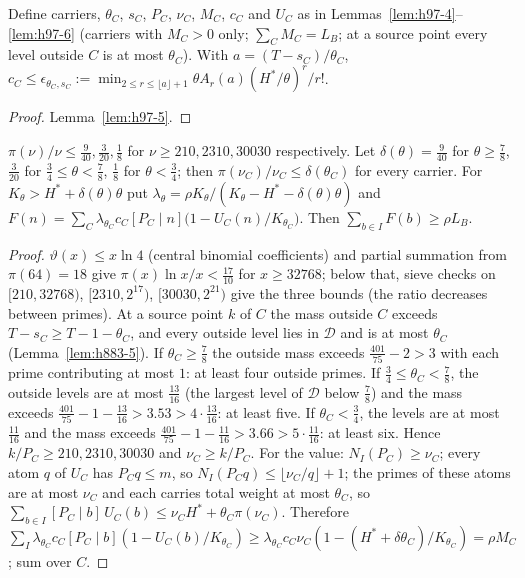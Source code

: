 \begin{lemma}\label{lem:h883-5}
Define carriers, $\theta_C$, $s_C$, $P_C$, $\nu_C$, $M_C$, $c_C$ and $U_C$ as in Lemmas~\ref{lem:h97-4}--\ref{lem:h97-6}
(carriers with $M_C>0$ only; $\sum_CM_C=L_B$; at a source point every level outside $C$ is at most $\theta_C$). With
$a=(T-s_C)/\theta_C$, $c_C\le\epsilon_{\theta_C,s_C}:=\min_{2\le r\le\lfloor a\rfloor+1}\theta A_r(a)(H^*/\theta)^r/r!$.
\end{lemma}
\begin{proof}
Lemma~\ref{lem:h97-5}.
\end{proof}

\begin{lemma}\label{lem:h883-6}
$\pi(\nu)/\nu\le\tfrac9{40},\tfrac3{20},\tfrac18$ for $\nu\ge210,2310,30030$ respectively. Let
$\delta(\theta)=\tfrac9{40}$ for $\theta\ge\tfrac78$, $\tfrac3{20}$ for $\tfrac34\le\theta<\tfrac78$, $\tfrac18$ for
$\theta<\tfrac34$; then $\pi(\nu_C)/\nu_C\le\delta(\theta_C)$ for every carrier. For $K_\theta>H^*+\delta(\theta)\theta$
put $\lambda_\theta=\rho K_\theta/(K_\theta-H^*-\delta(\theta)\theta)$ and
$F(n)=\sum_C\lambda_{\theta_C}c_C[P_C\mid n]\bigl(1-U_C(n)/K_{\theta_C}\bigr)$. Then
$\sum_{b\in I}F(b)\ge\rho L_B$.
\end{lemma}
\begin{proof}
$\vartheta(x)\le x\ln4$ (central binomial coefficients) and partial summation from $\pi(64)=18$ give
$\pi(x)\ln x/x<\tfrac{17}{10}$ for $x\ge32768$; below that, sieve checks on $[210,32768)$, $[2310,2^{17})$,
$[30030,2^{21})$ give the three bounds (the ratio decreases between primes). At a source point $k$ of $C$ the mass
outside $C$ exceeds $T-s_C\ge T-1-\theta_C$, and every outside level lies in $\mathcal D$ and is at most $\theta_C$
(Lemma~\ref{lem:h883-5}). If $\theta_C\ge\tfrac78$ the outside mass exceeds $\tfrac{401}{75}-2>3$ with each prime
contributing at most $1$: at least four outside primes. If $\tfrac34\le\theta_C<\tfrac78$, the outside levels are at
most $\tfrac{13}{16}$ (the largest level of $\mathcal D$ below $\tfrac78$) and the mass exceeds
$\tfrac{401}{75}-1-\tfrac{13}{16}>3.53>4\cdot\tfrac{13}{16}$: at least five. If $\theta_C<\tfrac34$, the levels are at
most $\tfrac{11}{16}$ and the mass exceeds $\tfrac{401}{75}-1-\tfrac{11}{16}>3.66>5\cdot\tfrac{11}{16}$: at least six.
Hence $k/P_C\ge210,2310,30030$ and $\nu_C\ge k/P_C$. For the value: $N_I(P_C)\ge\nu_C$; every atom $q$ of $U_C$ has
$P_Cq\le m$, so $N_I(P_Cq)\le\lfloor\nu_C/q\rfloor+1$; the primes of these atoms are at most $\nu_C$ and each carries
total weight at most $\theta_C$, so $\sum_{b\in I}[P_C\mid b]\,U_C(b)\le\nu_CH^*+\theta_C\pi(\nu_C)$. Therefore
$\sum_I\lambda_{\theta_C}c_C[P_C\mid b](1-U_C(b)/K_{\theta_C})\ge\lambda_{\theta_C}c_C\nu_C
(1-(H^*+\delta\theta_C)/K_{\theta_C})=\rho M_C$; sum over $C$.
\end{proof}

